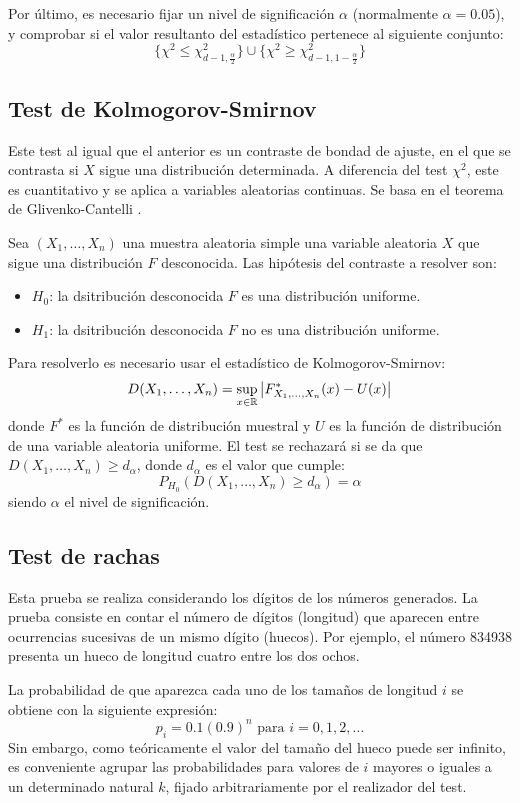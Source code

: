 Por último, es necesario fijar un nivel de significación $\alpha$ (normalmente  $\alpha=0.05$), y comprobar si el valor resultanto del estadístico pertenece al siguiente conjunto:
\[
\{\chi^2\leq \chi^2_{d-1,\frac{\alpha}{2}}\}\cup\{\chi^2\geq \chi^2_{d-1,1-\frac{\alpha}{2}}\}
\]

\subsection{Test de Kolmogorov-Smirnov}

Este test al igual que el anterior es un contraste de bondad de ajuste, en el que se contrasta si $X$ sigue una distribución determinada. A diferencia del test $\chi^2$, este es cuantitativo y se aplica a variables aleatorias continuas. Se basa en el teorema de Glivenko-Cantelli \cite{talagrand1987glivenko}.

Sea $(X_1,\ldots,X_n)$ una muestra aleatoria simple una variable aleatoria $X$ que sigue una distribución $F$ desconocida. Las hipótesis del contraste a resolver son:
\begin{itemize}
\item $H_0$: la dsitribución desconocida $F$ es una distribución uniforme.
\item $H_1$: la dsitribución desconocida $F$ no es una distribución uniforme.
\end{itemize}
Para resolverlo es necesario usar el estadístico de Kolmogorov-Smirnov:
\[
D(X_1,\ldots, X_n)=\sup_{x\in\mathbb{R}}\left|F^*_{X_1,\ldots, X_n}(x)-U(x)\right|
\]
donde $F^*$ es la función de distribución muestral y $U$ es la función de distribución de una variable aleatoria uniforme. El test se rechazará si se da que $D(X_1,\ldots,X_n)\geq d_\alpha$, donde $d_\alpha$ es el valor que cumple:
\[
P_{H_0}(D(X_1,\ldots,X_n)\geq d_\alpha)=\alpha
\]
siendo $\alpha$ el nivel de significación.
\subsection{Test de rachas}

Esta prueba se realiza considerando los dígitos de los números generados. La prueba consiste en contar el número de dígitos (longitud) que aparecen entre ocurrencias sucesivas de un mismo dígito (huecos). Por ejemplo, el número 834938 presenta un hueco de longitud cuatro entre los dos ochos.

La probabilidad de que aparezca cada uno de los tamaños de longitud $i$ se obtiene con la siguiente expresión:
\[
p_i=0.1(0.9)^n \,\, \text{para } i=0,1,2,\ldots
\]
Sin embargo, como teóricamente el valor del tamaño del hueco puede ser infinito, es conveniente agrupar las probabilidades para valores de $i$ mayores o iguales a un determinado natural $k$, fijado arbitrariamente por el realizador del test.

